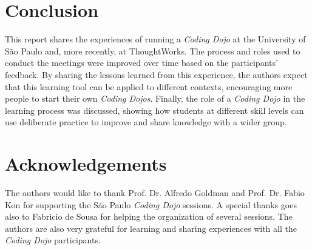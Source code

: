 \section{Conclusion}\label{sec:conclusion}

This report shares the experiences of running a \emph{Coding Dojo} at
the University of São Paulo and, more recently, at ThoughtWorks. The
process and roles used to conduct the meetings were improved over time
based on the participants' feedback. By sharing the lessons learned from
this experience, the authors expect that this learning tool can be applied
to different contexts, encouraging more people to start their own
\emph{Coding Dojos}. Finally, the role of a \emph{Coding Dojo} in the learning
process was discussed, showing how students at different skill levels can use
deliberate practice to improve and share knowledge with a wider group.

\section*{Acknowledgements}

The authors would like to thank Prof. Dr. Alfredo Goldman and
Prof. Dr. Fabio Kon for supporting the São Paulo \emph{Coding Dojo}
sessions. %
A special thanks goes
also to Fabricio de Sousa for helping the organization of several
sessions. %
The authors are also very grateful for learning
and sharing experiences with all the \emph{Coding Dojo} participants.
